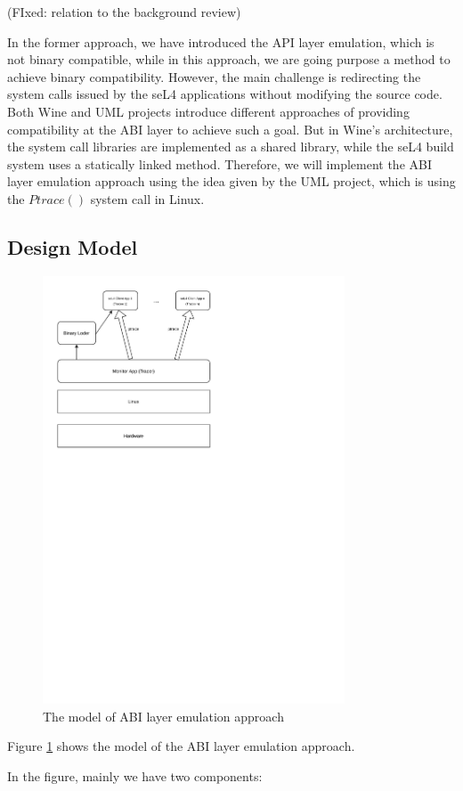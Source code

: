 (FIxed: relation to the background review)

In the former approach, we have introduced the API layer emulation, which is not binary compatible, while in this approach, we are going purpose a method to achieve binary compatibility. However, the main challenge is redirecting the system calls issued by the seL4 applications without modifying the source code. Both Wine and UML projects introduce different approaches of providing compatibility at the ABI layer to achieve such a goal. But in Wine's architecture, the system call libraries are implemented as a shared library, while the seL4 build system uses a statically linked method. Therefore, we will implement the ABI layer emulation approach using the idea given by the UML project, which is using the $Ptrace()$ system call in Linux.

\subsection{Design Model}

\begin{figure}[h]
    \centering
    \includegraphics[clip, trim=0.5cm 16cm 8cm 0.5cm, width=0.8\textwidth, height=0.8\textwidth]{ch3/model2-v2.pdf}
    \caption{The model of ABI layer emulation approach}
    \label{fig:mabi}
\end{figure}

Figure \ref{fig:mabi} shows the model of the ABI layer emulation approach.

In the figure, mainly we have two components:

